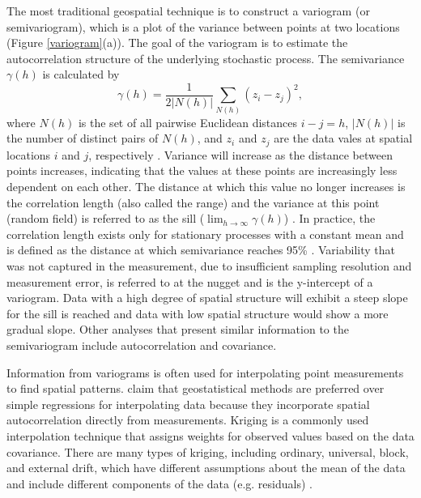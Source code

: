 \documentclass{sfuthesis}
\begin{document}
The most traditional geospatial technique is to construct a variogram (or semivariogram), which is a plot of the variance between points at two locations (Figure \ref{variogram}(a)). The goal of the variogram is to estimate the autocorrelation structure of the underlying stochastic process. The semivariance $\gamma \left(h\right)$ is calculated by
\begin{equation}
\gamma(h) = \frac{1}{2\left| N(h) \right|}\sum_{N(h)} \left(z_i-z_j \right)^2 ,
\end{equation}
where $N(h)$ is the set of all pairwise Euclidean distances $i-j=h$, $\left|N(h)\right|$ is the number of distinct pairs of $N(h)$, and $z_i$ and $z_j$ are the data vales at spatial locations $i$ and $j$, respectively \citep{Schirmer2011a}. Variance will increase as the distance between points increases, indicating that the values at these points are increasingly less dependent on each other. The distance at which this value no longer increases is the correlation length (also called the range) and the variance at this point (random field) is referred to as the sill ($\lim_{h\to\infty}\gamma(h)$) \citep{Srivastava2013}. In practice, the correlation length exists only for stationary processes with a constant mean and is defined as the distance at which semivariance reaches 95\% \citep{Deems2006a}. Variability that was not captured in the measurement, due to insufficient sampling resolution and measurement error, is referred to at the nugget and is the y-intercept of a variogram. Data with a high degree of spatial structure will exhibit a steep slope for the sill is reached and data with low spatial structure would show a more gradual slope. Other analyses that present similar information to the semivariogram include autocorrelation and covariance.

Information from variograms is often used for interpolating point measurements to find spatial patterns. \cite{Reuter2016} claim that geostatistical methods are preferred over simple regressions for interpolating data because they incorporate spatial autocorrelation directly from measurements. Kriging is a commonly used interpolation technique that assigns weights for observed values based on the data covariance. There are many types of kriging, including ordinary, universal, block, and external drift, which have different assumptions about the mean of the data and include different components of the data (e.g. residuals) \citep{Webster2001}. 
\end{document}
